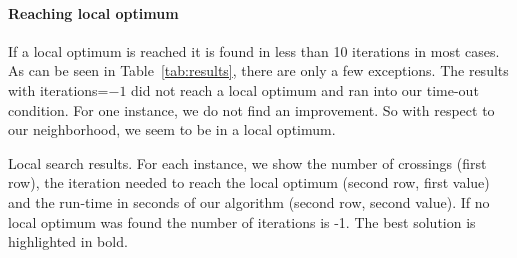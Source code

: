 \documentclass{scrartcl}
\begin{document}
\paragraph{Reaching local optimum}
If a local optimum is reached it is found in less than 10 iterations
in most cases.  As can be seen in Table~\ref{tab:results}, there are
only a few exceptions. The results with iterations=$-1$ did not reach
a local optimum and ran into our time-out condition. For one instance,
we do not find an improvement. So with respect to our neighborhood, we
seem to be in a local optimum.







\begin{landscape}
\begin{table}
  \scriptsize
  
\caption{Local search results. For each instance, we show the number
  of crossings (first row), the iteration needed to reach the local
  optimum (second row, first value) and the run-time in seconds of our
  algorithm (second row, second value).  If no local optimum was found
  the number of iterations is -1. The best solution is highlighted in
  bold.}
\label{tab:results}
\end{table}
\end{landscape}
\end{document}

